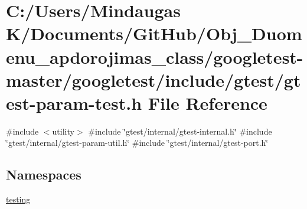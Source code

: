 \hypertarget{googletest-master_2googletest_2include_2gtest_2gtest-param-test_8h}{}\section{C\+:/\+Users/\+Mindaugas K/\+Documents/\+Git\+Hub/\+Obj\+\_\+\+Duomenu\+\_\+apdorojimas\+\_\+class/googletest-\/master/googletest/include/gtest/gtest-\/param-\/test.h File Reference}
\label{googletest-master_2googletest_2include_2gtest_2gtest-param-test_8h}
{\ttfamily \#include $<$utility$>$}\newline
{\ttfamily \#include \char`\"{}gtest/internal/gtest-\/internal.\+h\char`\"{}}\newline
{\ttfamily \#include \char`\"{}gtest/internal/gtest-\/param-\/util.\+h\char`\"{}}\newline
{\ttfamily \#include \char`\"{}gtest/internal/gtest-\/port.\+h\char`\"{}}\newline
\subsection*{Namespaces}
\begin{DoxyCompactItemize}
\item 
 \mbox{\hyperlink{namespacetesting}{testing}}
\end{DoxyCompactItemize}
